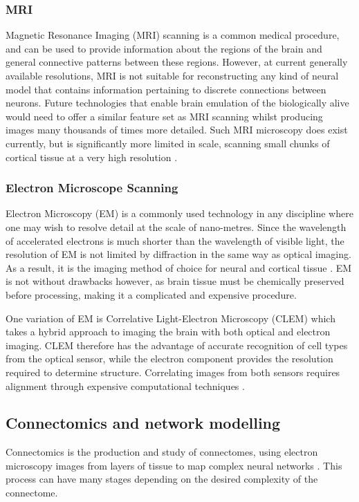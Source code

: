 \subsubsection*{MRI}

Magnetic Resonance Imaging (MRI) scanning is a common medical procedure, and can
be used to provide information about the regions of the brain and general
connective patterns between these regions. However, at current generally
available resolutions, MRI is not suitable for reconstructing any kind of neural
model that contains information pertaining to discrete connections between
neurons. Future technologies that enable brain emulation of the
biologically alive would need to offer a similar feature set as MRI scanning
whilst producing images many thousands of times more detailed. Such MRI
microscopy does exist currently, but is significantly more limited in scale,
scanning small chunks of cortical tissue at a very high resolution
\autocite{johnson_three-dimensional_1987,bostrom_whole_2008}.

\subsubsection*{Electron Microscope Scanning}

Electron Microscopy (EM) is a commonly used technology in any discipline where
one may wish to resolve detail at the scale of nano-metres. Since the wavelength
of accelerated electrons is much shorter than the wavelength of visible light,
the resolution of EM is not limited by diffraction in the same way as optical
imaging. As a result, it is the imaging method of choice for neural and cortical
tissue \autocite{marc_retinal_2013, kaynig_large-scale_2015}. EM is not without
drawbacks however, as brain tissue must be chemically preserved before
processing, making it a complicated and expensive procedure. 

One variation of EM is Correlative Light-Electron Microscopy (CLEM) which takes
a hybrid approach to imaging the brain with both optical and electron imaging.
CLEM therefore has the advantage of accurate recognition of cell types from the
optical sensor, while the electron component provides the resolution required to
determine structure. Correlating images from both sensors requires alignment
through expensive computational techniques \autocite{voortman_integration_2014}.


\subsection{Connectomics and network modelling}
Connectomics is the production and study of connectomes, using electron
microscopy images from layers of tissue to map complex neural networks
\autocite{marc_retinal_2013}. This process can have many stages depending on the
desired complexity of the connectome. 

